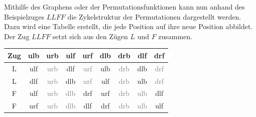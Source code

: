 \documentclass[12pt,a4paper, usenames, dvipsnames]{article}
\theoremstyle{mystyle}
\theoremstyle{definition}
\begin{document}
Mithilfe des Graphens oder der Permutationsfunktionen kann nun anhand des Beispielzuges $LLFF$ die Zykelstruktur der Permutationen dargestellt werden. 
Dazu wird eine Tabelle erstellt, die jede Position auf ihre neue Position abbildet. Der Zug $LLFF$ setzt sich aus den Zügen $L$ und $F$ zusammen. 

\begin{center}
\begin{tabular}{ccccccccc}
\toprule
\textbf{Zug} & \textbf{ulb} & \textbf{urb} & \textbf{ulf} & \textbf{urf} & \textbf{dlb} & \textbf{drb} & \textbf{dlf} & \textbf{drf} \\
\midrule

L & ulf & \textcolor{gray}{urb} & dlf & \textcolor{gray}{urf} & ulb & \textcolor{gray}{drb} & dlb & \textcolor{gray}{drf} \\

L & dlf & \textcolor{gray}{urb} & dlb & \textcolor{gray}{urf} & ulf & \textcolor{gray}{drb} & ulb & \textcolor{gray}{drf} \\

F & ulf & \textcolor{gray}{urb} & \textcolor{gray}{dlb} & drf & urf & \textcolor{gray}{drb} & \textcolor{gray}{ulb} & dlf \\

F & urf & \textcolor{gray}{urb} & \textcolor{gray}{dlb} & dlf & drf & \textcolor{gray}{drb} & \textcolor{gray}{ulb} & ulf \\
\bottomrule
\end{tabular}
\end{center}
\end{document}
